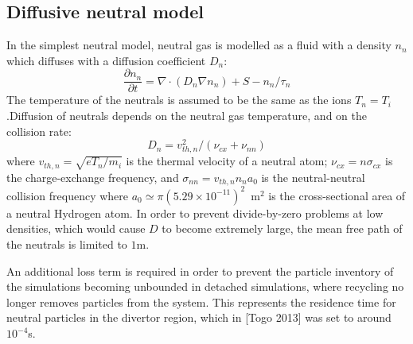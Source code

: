 \documentclass[12pt,a4paper]{article}
\begin{document}
\subsection{Diffusive neutral model}

In the simplest neutral model, neutral gas is modelled as a fluid with a density $n_n$ which diffuses with a diffusion coefficient $D_n$:
\begin{equation}
 \frac{\partial n_n}{\partial t} = \nabla\cdot\left(D_n\nabla n_n\right) + S - n_n / \tau_n
\end{equation}
The temperature of the neutrals is assumed to be the same as the ions
$T_n = T_i$.Diffusion of neutrals depends on the neutral gas temperature, and on the collision rate:
\begin{equation}
D_n = v^2_{th,n} / \left(\nu_{cx} + \nu_{nn}\right)
\end{equation}
where $v_{th,n} = \sqrt{eT_n/m_i}$ is the thermal velocity of a neutral atom; $\nu_{cx} = n\sigma_{cx}$ is the charge-exchange
frequency, and $\sigma_{nn} = v_{th,n} n_n a_0$ is the neutral-neutral collision frequency 
where $a_0 \simeq \pi \left(5.29\times 10^{-11}\right)^2$~m$^2$ is the cross-sectional area of a neutral Hydrogen atom. In order to prevent divide-by-zero problems at low densities, which would cause $D$ to become extremely large,
the mean free path of the neutrals is limited to $1$m. 

An additional loss term is required in order to prevent the particle inventory of the simulations becoming unbounded in detached simulations, where recycling no longer removes particles from the system. This represents the
residence time for neutral particles in the divertor region, which in [Togo 2013] was set to around $10^{-4}$s.
\end{document}
